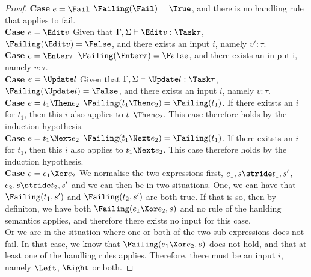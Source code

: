 \begin{proof}

  \noindent\textbf{Case} $e = \Fail$ $\Failing(\Fail)=\True$, and there is no handling rule that applies to fail.\\

  \noindent\textbf{Case} $e = \Edit v$ Given that $\Gamma,\Sigma\infers\Edit v:\Task\tau$, $\Failing(\Edit v)=\False$, and there exists an input $i$, namely $v':\tau$.\\

  \noindent\textbf{Case} $e = \Enter \tau$ $\Failing(\Enter \tau)=\False$, and there exists an in put i, namely $v:\tau$.\\

  \noindent\textbf{Case} $e = \Update l$ Given that $\Gamma,\Sigma\infers\Update l:\Task\tau$, $\Failing(\Update l)=\False$, and there exists an input $i$, namely $v:\tau$.\\

  \noindent\textbf{Case} $e = t_1\Then e_2$ $\Failing(t_1\Then e_2)=\Failing(t_1)$. If there exitsts an $i$ for $t_1$, then this $i$ also applies to $t_1\Then e_2$. This case therefore holds by the induction hypothesis.\\

  \noindent\textbf{Case} $e = t_1\Next e_2$ $\Failing(t_1\Next e_2)=\Failing(t_1)$. If there exitsts an $i$ for $t_1$, then this $i$ also applies to $t_1\Next e_2$. This case therefore holds by the induction hypothesis.\\

  \noindent\textbf{Case} $e = e_1\Xor e_2$ We normalise the two expressions first, $e_1,s\stride t_1,s'$, $e_2,s\stride t_2,s'$ and we can then be in two situations. One, we can have that $\Failing(t_1,s')$ and $\Failing(t_2,s')$ are both true. If that is so, then by definiton, we have both $\Failing(e_1\Xor e_2,s)$ and no rule of the hanlding semantics applies, and therefore there exists no input for this case.\\
                                           Or we are in the situation where one or both of the two sub expressions does not fail. In that case, we know that $\Failing(e_1\Xor e_2,s)$ does not hold, and that at least one of the handling rules applies. Therefore, there must be an input $i$, namely $\Left$, $\Right$ or both.


\end{proof}
